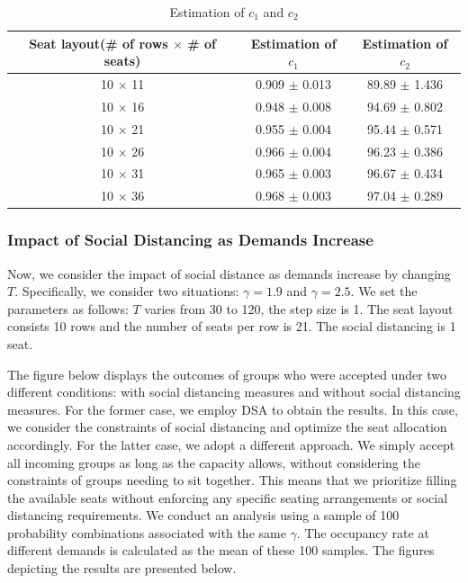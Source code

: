 \begin{table}[ht]
  \centering
  \caption{Estimation of $c_1$ and $c_2$}
  \begin{tabular}{|c|c|c|}
  \hline
   Seat layout(\# of rows $\times$ \# of seats) & Estimation of $c_1$ & Estimation of $c_2$  \\
  \hline
   10 $\times$ 11 & 0.909 $\pm$ 0.013  & 89.89 $\pm$ 1.436 \\
   10 $\times$ 16 & 0.948 $\pm$ 0.008  & 94.69 $\pm$ 0.802 \\
   10 $\times$ 21 & 0.955 $\pm$ 0.004 & 95.44 $\pm$ 0.571 \\
   10 $\times$ 26 & 0.966 $\pm$ 0.004 & 96.23 $\pm$ 0.386 \\
   10 $\times$ 31 & 0.965 $\pm$ 0.003 & 96.67 $\pm$ 0.434 \\
   10 $\times$ 36 & 0.968 $\pm$ 0.003 & 97.04 $\pm$ 0.289 \\
   \hline
  \end{tabular}
\end{table}




\subsubsection{Impact of Social Distancing as Demands Increase}
Now, we consider the impact of social distance as demands increase by changing $T$. Specifically, we consider two situations: $\gamma = 1.9$ and $\gamma = 2.5$. We set the parameters as follows: $T$ varies from 30 to 120, the step size is 1.  The seat layout consists 10 rows and the number of seats per row is 21. The social distancing is 1 seat.

The figure below displays the outcomes of groups who were accepted under two different conditions: with social distancing measures and without social distancing measures. For the former case, we employ DSA to obtain the results. In this case, we consider the constraints of social distancing and optimize the seat allocation accordingly. For the latter case, we adopt a different approach. We simply accept all incoming groups as long as the capacity allows, without considering the constraints of groups needing to sit together. This means that we prioritize filling the available seats without enforcing any specific seating arrangements or social distancing requirements. We conduct an analysis using a sample of 100 probability combinations associated with the same $\gamma$. The occupancy rate at different demands is calculated as the mean of these 100 samples. The figures depicting the results are presented below.

